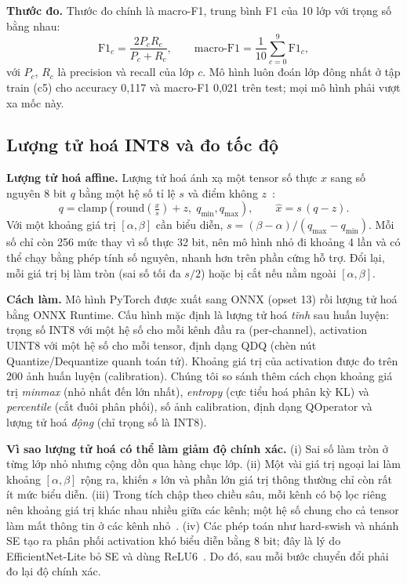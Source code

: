 \documentclass[10pt,a4paper,twocolumn]{article}
\begin{document}
\textbf{Thước đo.} Thước đo chính là macro-F1, trung bình F1 của 10 lớp với trọng số bằng nhau:
\begin{equation}
\mathrm{F1}_c=\frac{2P_cR_c}{P_c+R_c},\qquad \text{macro-F1}=\frac{1}{10}\sum_{c=0}^{9}\mathrm{F1}_c ,
\end{equation}
với $P_c$, $R_c$ là precision và recall của lớp $c$. Mô hình luôn đoán lớp đông nhất ở tập train (c5) cho accuracy 0,117 và macro-F1 0,021 trên test; mọi mô hình phải vượt xa mốc này.

\subsection{Lượng tử hoá INT8 và đo tốc độ}
\label{sec:quant}
\textbf{Lượng tử hoá affine.} Lượng tử hoá ánh xạ một tensor số thực $x$ sang số nguyên 8 bit $q$ bằng một hệ số tỉ lệ $s$ và điểm không $z$~\cite{jacob2018quant}:
\begin{equation}
q=\mathrm{clamp}\!\left(\mathrm{round}\!\left(\tfrac{x}{s}\right)+z,\;q_{\min},q_{\max}\right),\qquad \hat{x}=s\,(q-z).
\end{equation}
Với một khoảng giá trị $[\alpha,\beta]$ cần biểu diễn, $s=(\beta-\alpha)/(q_{\max}-q_{\min})$. Mỗi số chỉ còn 256 mức thay vì số thực 32 bit, nên mô hình nhỏ đi khoảng 4 lần và có thể chạy bằng phép tính số nguyên, nhanh hơn trên phần cứng hỗ trợ. Đổi lại, mỗi giá trị bị làm tròn (sai số tối đa $s/2$) hoặc bị cắt nếu nằm ngoài $[\alpha,\beta]$.

\textbf{Cách làm.} Mô hình PyTorch được xuất sang ONNX (opset 13) rồi lượng tử hoá bằng ONNX Runtime. Cấu hình mặc định là lượng tử hoá \emph{tĩnh} sau huấn luyện: trọng số INT8 với một hệ số cho mỗi kênh đầu ra (per-channel), activation UINT8 với một hệ số cho mỗi tensor, định dạng QDQ (chèn nút Quantize/Dequantize quanh toán tử). Khoảng giá trị của activation được đo trên 200 ảnh huấn luyện (calibration). Chúng tôi so sánh thêm cách chọn khoảng giá trị \emph{minmax} (nhỏ nhất đến lớn nhất), \emph{entropy} (cực tiểu hoá phân kỳ KL) và \emph{percentile} (cắt đuôi phân phối), số ảnh calibration, định dạng QOperator và lượng tử hoá \emph{động} (chỉ trọng số là INT8).

\textbf{Vì sao lượng tử hoá có thể làm giảm độ chính xác.}
(i) Sai số làm tròn ở từng lớp nhỏ nhưng cộng dồn qua hàng chục lớp.
(ii) Một vài giá trị ngoại lai làm khoảng $[\alpha,\beta]$ rộng ra, khiến $s$ lớn và phần lớn giá trị thông thường chỉ còn rất ít mức biểu diễn.
(iii) Trong tích chập theo chiều sâu, mỗi kênh có bộ lọc riêng nên khoảng giá trị khác nhau nhiều giữa các kênh; một hệ số chung cho cả tensor làm mất thông tin ở các kênh nhỏ~\cite{krishnamoorthi2018}.
(iv) Các phép toán như hard-swish và nhánh SE tạo ra phân phối activation khó biểu diễn bằng 8 bit; đây là lý do EfficientNet-Lite bỏ SE và dùng ReLU6~\cite{efficientnetlite}.
Do đó, sau mỗi bước chuyển đổi phải đo lại độ chính xác.
\end{document}
